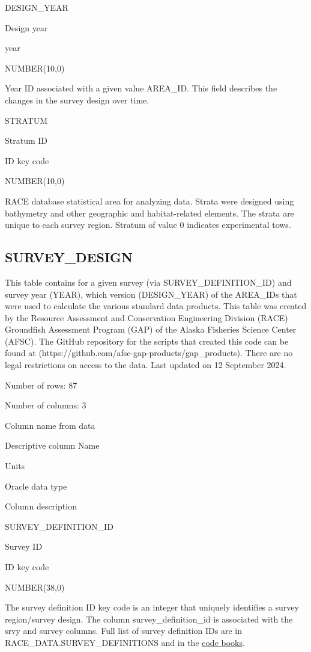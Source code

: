 \documentclass[
  letterpaper,
  oneside,
  open=any]{scrbook}
\begin{document}
DESIGN\_YEAR

Design year

year

NUMBER(10,0)

Year ID associated with a given value AREA\_ID. This field describes the
changes in the survey design over time.

STRATUM

Stratum ID

ID key code

NUMBER(10,0)

RACE database statistical area for analyzing data. Strata were designed
using bathymetry and other geographic and habitat-related elements. The
strata are unique to each survey region. Stratum of value 0 indicates
experimental tows.

\subsection{SURVEY\_DESIGN}\label{survey_design}

This table contains for a given survey (via SURVEY\_DEFINITION\_ID) and
survey year (YEAR), which version (DESIGN\_YEAR) of the AREA\_IDs that
were used to calculate the various standard data products. This table
was created by the Resource Assessment and Conservation Engineering
Division (RACE) Groundfish Assessment Program (GAP) of the Alaska
Fisheries Science Center (AFSC). The GitHub repository for the scripts
that created this code can be found at
(https://github.com/afsc-gap-products/gap\_products). There are no legal
restrictions on access to the data. Last updated on 12 September 2024.

Number of rows: 87

Number of columns: 3

Column name from data

Descriptive column Name

Units

Oracle data type

Column description

SURVEY\_DEFINITION\_ID

Survey ID

ID key code

NUMBER(38,0)

The survey definition ID key code is an integer that uniquely identifies
a survey region/survey design. The column survey\_definition\_id is
associated with the srvy and survey columns. Full list of survey
definition IDs are in RACE\_DATA.SURVEY\_DEFINITIONS and in the
\href{https://www.fisheries.noaa.gov/resource/document/groundfish-survey-species-code-manual-and-data-codes-manual}{code
books}.
\end{document}
